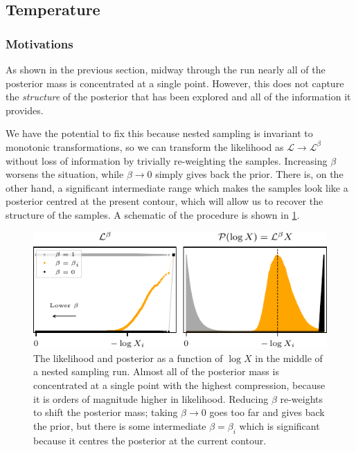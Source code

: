 \documentclass[usenatbib]{mnras}
\newcommand{\Like}{\mathcal{L}}
\begin{document}
\subsection{Temperature}\label{sec:temperature}
\subsubsection*{Motivations}
As shown in the previous section, midway through the run nearly all of the posterior mass is concentrated at a single point. However, this does not capture the \textit{structure} of the posterior that has been explored and all of the information it provides. 
\par
We have the potential to fix this because nested sampling is invariant to monotonic transformations, so we can transform the likelihood as $\Like \to \Like^{\beta}$ without loss of information by trivially re-weighting the samples. Increasing $\beta$ worsens the situation, while $\beta \to 0$ simply gives back the prior. There is, on the other hand, a significant intermediate range which makes the samples look like a posterior centred at the present contour, which will allow us to recover the structure of the samples. A schematic of the procedure is shown in \cref{fig:last_live_point}.
\par
\begin{figure}
\begin{center}
    \includegraphics{figures/last_live_point.pdf}
\end{center}
\caption{The likelihood and posterior as a function of $\log X$ in the middle of a nested sampling run. Almost all of the posterior mass is concentrated at a single point with the highest compression, because it is orders of magnitude higher in likelihood. Reducing $\beta$ re-weights to shift the posterior mass; taking $\beta \to 0$ goes too far and gives back the prior, but there is some intermediate $\beta = \beta_i$ which is significant because it centres the posterior at the current contour.}
\label{fig:last_live_point}
\end{figure}
\end{document}
